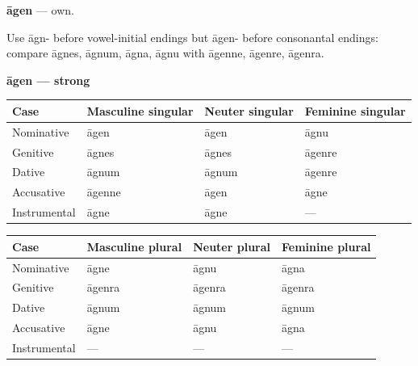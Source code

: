 \par\begin{minipage}{\linewidth}\raggedright
\textbf{āgen} — own.

Use āgn- before vowel-initial endings but āgen- before consonantal endings: compare āgnes, āgnum, āgna, āgnu with āgenne, āgenre, āgenra.

\textbf{āgen — strong}

\par\begingroup
\fontsize{10.5}{13.2}\selectfont
\setlength{\LTleft}{0pt}\setlength{\LTright}{\fill}
\noindent
\begin{tabular}{@{}>{\raggedright\arraybackslash}p{22.0mm}>{\raggedright\arraybackslash}p{31.188mm}>{\raggedright\arraybackslash}p{31.188mm}>{\raggedright\arraybackslash}p{31.188mm}@{}}
\toprule
\textbf{Case} & \textbf{Masculine singular} & \textbf{Neuter singular} & \textbf{Feminine singular} \\
\midrule
Nominative & āgen & āgen & āgnu \\
Genitive & āgnes & āgnes & āgenre \\
Dative & āgnum & āgnum & āgenre \\
Accusative & āgenne & āgen & āgne \\
Instrumental & āgne & āgne & — \\
\bottomrule
\end{tabular}
\par\endgroup
\end{minipage}\par
\par\addvspace{5pt}
\par\begingroup
\fontsize{10.5}{13.2}\selectfont
\setlength{\LTleft}{0pt}\setlength{\LTright}{\fill}
\noindent
\begin{tabular}{@{}>{\raggedright\arraybackslash}p{22.0mm}>{\raggedright\arraybackslash}p{31.188mm}>{\raggedright\arraybackslash}p{31.188mm}>{\raggedright\arraybackslash}p{31.188mm}@{}}
\toprule
\textbf{Case} & \textbf{Masculine plural} & \textbf{Neuter plural} & \textbf{Feminine plural} \\
\midrule
Nominative & āgne & āgnu & āgna \\
Genitive & āgenra & āgenra & āgenra \\
Dative & āgnum & āgnum & āgnum \\
Accusative & āgne & āgnu & āgna \\
Instrumental & — & — & — \\
\bottomrule
\end{tabular}
\par\endgroup

